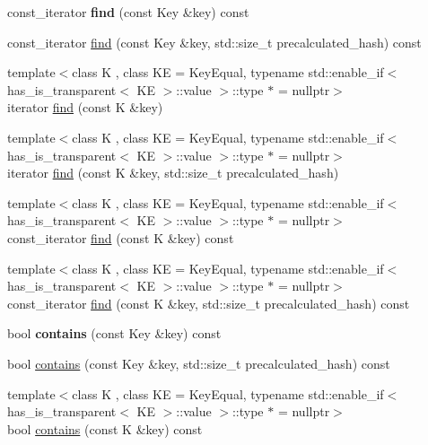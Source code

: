 \begin{DoxyCompactItemize}
\item 
\mbox{\label{classtsl_1_1ordered__map_a934d6606c3e6c182605547de94e2535c}} 
const\+\_\+iterator {\bfseries find} (const Key \&key) const
\item 
const\+\_\+iterator \mbox{\hyperlink{classtsl_1_1ordered__map_a817dd3a88ebcf2199e46606fd7925c5f}{find}} (const Key \&key, std\+::size\+\_\+t precalculated\+\_\+hash) const
\item 
{\footnotesize template$<$class K , class KE  = Key\+Equal, typename std\+::enable\+\_\+if$<$ has\+\_\+is\+\_\+transparent$<$ K\+E $>$\+::value $>$\+::type $\ast$  = nullptr$>$ }\\iterator \mbox{\hyperlink{classtsl_1_1ordered__map_a077b9b318cb7e846455f030602561b3f}{find}} (const K \&key)
\item 
{\footnotesize template$<$class K , class KE  = Key\+Equal, typename std\+::enable\+\_\+if$<$ has\+\_\+is\+\_\+transparent$<$ K\+E $>$\+::value $>$\+::type $\ast$  = nullptr$>$ }\\iterator \mbox{\hyperlink{classtsl_1_1ordered__map_a98ecf180c88d8cc7a71573607d86b50f}{find}} (const K \&key, std\+::size\+\_\+t precalculated\+\_\+hash)
\item 
{\footnotesize template$<$class K , class KE  = Key\+Equal, typename std\+::enable\+\_\+if$<$ has\+\_\+is\+\_\+transparent$<$ K\+E $>$\+::value $>$\+::type $\ast$  = nullptr$>$ }\\const\+\_\+iterator \mbox{\hyperlink{classtsl_1_1ordered__map_acc1fb65ec2b2b8680393044a811cfbd2}{find}} (const K \&key) const
\item 
{\footnotesize template$<$class K , class KE  = Key\+Equal, typename std\+::enable\+\_\+if$<$ has\+\_\+is\+\_\+transparent$<$ K\+E $>$\+::value $>$\+::type $\ast$  = nullptr$>$ }\\const\+\_\+iterator \mbox{\hyperlink{classtsl_1_1ordered__map_a1499b8cd1f9ab16341ac65008a26aad8}{find}} (const K \&key, std\+::size\+\_\+t precalculated\+\_\+hash) const
\item 
\mbox{\label{classtsl_1_1ordered__map_a7e8f0bf2927011a11e66140e5ec9ff1b}} 
bool {\bfseries contains} (const Key \&key) const
\item 
bool \mbox{\hyperlink{classtsl_1_1ordered__map_a5b0dd1e82f8c3c905ea62542f6f374c9}{contains}} (const Key \&key, std\+::size\+\_\+t precalculated\+\_\+hash) const
\item 
{\footnotesize template$<$class K , class KE  = Key\+Equal, typename std\+::enable\+\_\+if$<$ has\+\_\+is\+\_\+transparent$<$ K\+E $>$\+::value $>$\+::type $\ast$  = nullptr$>$ }\\bool \mbox{\hyperlink{classtsl_1_1ordered__map_a62b1a90a19ebdacd4a69c64b38d0ad97}{contains}} (const K \&key) const

\end{DoxyCompactItemize}
